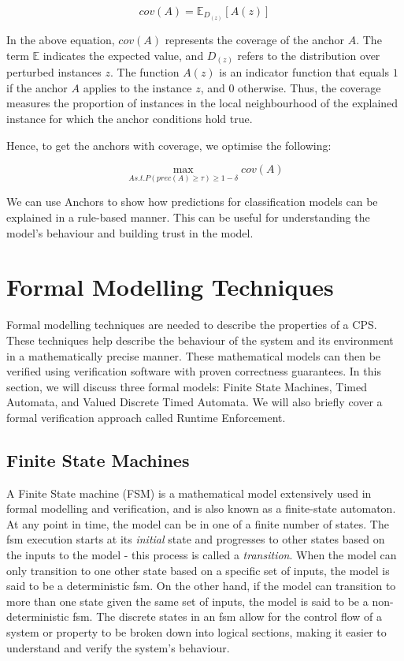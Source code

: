 \begin{equation}
 cov(A) = \mathbb{E}_{D_{(z)}}[A(z)]
\end{equation}

In the above equation, $cov(A)$ represents the coverage of the anchor $A$. The term $\mathbb{E}$ indicates the expected value, and $D_{(z)}$ refers to the distribution over perturbed instances $z$. The function $A(z)$ is an indicator function that equals $1$ if the anchor $A$ applies to the instance $z$, and $0$ otherwise. Thus, the coverage measures the proportion of instances in the local neighbourhood of the explained instance for which the anchor conditions hold true.


Hence, to get the anchors with coverage, we optimise the following:

\begin{equation}
 \max_{A s.t. P(prec(A) \geq \tau)\geq 1 - \delta} cov(A)
\end{equation}


We can use Anchors to show how predictions for classification models can be explained in a rule-based manner. This can be useful for understanding the model's behaviour and building trust in the model.


\section{Formal Modelling Techniques}
Formal modelling techniques are needed to describe the properties of a CPS. These techniques help describe the behaviour of the system and its environment in a mathematically precise manner. These mathematical models can then be verified using verification software with proven correctness guarantees. In this section, we will discuss three formal models: Finite State Machines, Timed Automata, and Valued Discrete Timed Automata. We will also briefly cover a formal verification approach called Runtime Enforcement.

\subsection{Finite State Machines}
A Finite State machine (FSM) is a mathematical model extensively used in formal modelling and verification, and is also known as a finite-state automaton. At any point in time, the model can be in one of a finite number of states. The \gls{fsm} execution starts at its \emph{initial} state and progresses to other states based on the inputs to the model - this process is called a \emph{transition}. When the model can only transition to one other state based on a specific set of inputs, the model is said to be a deterministic \gls{fsm}. On the other hand, if the model can transition to more than one state given the same set of inputs, the model is said to be a non-deterministic \gls{fsm}. The discrete states in an \gls{fsm} allow for the control flow of a system or property to be broken down into logical sections, making it easier to understand and verify the system's behaviour.


